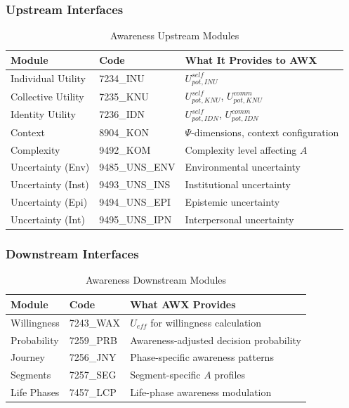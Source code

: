 \subsubsection{Upstream Interfaces}

\begin{table}[htbp]
\centering
\caption{Awareness Upstream Modules}
\label{tab:upstream}
\renewcommand{\arraystretch}{1.3}
\begin{tabular}{@{}lll@{}}
\toprule
\textbf{Module} & \textbf{Code} & \textbf{What It Provides to AWX} \\
\midrule
Individual Utility & 7234\_INU & $U^{self}_{pot,INU}$ \\
Collective Utility & 7235\_KNU & $U^{self}_{pot,KNU}$, $U^{comm}_{pot,KNU}$ \\
Identity Utility & 7236\_IDN & $U^{self}_{pot,IDN}$, $U^{comm}_{pot,IDN}$ \\
Context & 8904\_KON & $\Psi$-dimensions, context configuration \\
Complexity & 9492\_KOM & Complexity level affecting $A$ \\
Uncertainty (Env) & 9485\_UNS\_ENV & Environmental uncertainty \\
Uncertainty (Inst) & 9493\_UNS\_INS & Institutional uncertainty \\
Uncertainty (Epi) & 9494\_UNS\_EPI & Epistemic uncertainty \\
Uncertainty (Int) & 9495\_UNS\_IPN & Interpersonal uncertainty \\
\bottomrule
\end{tabular}
\end{table}

\subsubsection{Downstream Interfaces}

\begin{table}[htbp]
\centering
\caption{Awareness Downstream Modules}
\label{tab:downstream}
\renewcommand{\arraystretch}{1.3}
\begin{tabular}{@{}lll@{}}
\toprule
\textbf{Module} & \textbf{Code} & \textbf{What AWX Provides} \\
\midrule
Willingness & 7243\_WAX & $U_{eff}$ for willingness calculation \\
Probability & 7259\_PRB & Awareness-adjusted decision probability \\
Journey & 7256\_JNY & Phase-specific awareness patterns \\
Segments & 7257\_SEG & Segment-specific $A$ profiles \\
Life Phases & 7457\_LCP & Life-phase awareness modulation \\
\bottomrule
\end{tabular}
\end{table}

